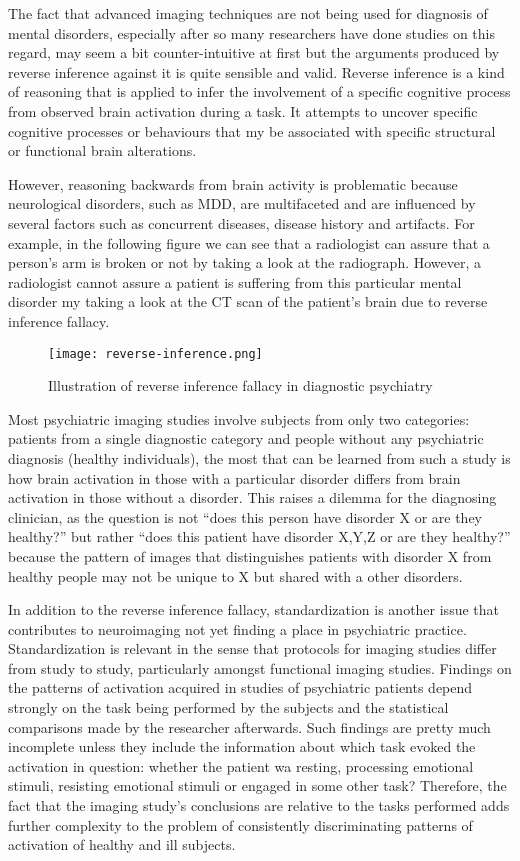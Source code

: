 \documentclass[12pt]{article}
\begin{document}
The fact that advanced imaging techniques are not being used for
diagnosis of mental disorders, especially after so many researchers
have done studies on this regard, may seem a bit counter-intuitive at
first but the arguments produced by reverse inference against it is
quite sensible and valid. Reverse inference is a kind of reasoning
that is applied to infer the involvement of a specific cognitive
process from observed brain activation during a task. It attempts to
uncover specific cognitive processes or behaviours that my be
associated with specific structural or functional brain alterations.

However, reasoning backwards from brain activity is problematic
because neurological disorders, such as MDD, are multifaceted and are
influenced by several factors such as concurrent diseases, disease
history and artifacts. For example, in the following figure we can see
that a radiologist can assure that a person’s arm is broken or not by
taking a look at the radiograph. However, a radiologist cannot assure
a patient is suffering from this particular mental disorder my taking
a look at the CT scan of the patient’s brain due to reverse inference
fallacy.

\begin{figure}[H]
  \centering
  \texttt{[image: reverse-inference.png]}
  \caption{Illustration of reverse inference fallacy in diagnostic
  psychiatry}
\end{figure}

Most psychiatric imaging studies involve subjects from only two
categories: patients from a single diagnostic category and people
without any psychiatric diagnosis (healthy individuals), the most that
can be learned from such a study is how brain activation in those with
a particular disorder differs from brain activation in those without
a disorder. This raises a dilemma for the diagnosing clinician, as the
question is not ``does this person have disorder X or are they
healthy?'' but rather ``does this patient have disorder X,Y,Z or are
they healthy?'' because the pattern of images that distinguishes
patients with disorder X from healthy people may not be unique to
X but shared with a other disorders.

In addition to the reverse inference fallacy, standardization is
another issue that contributes to neuroimaging not yet finding
a place in psychiatric practice. Standardization is relevant in the
sense that protocols for imaging studies differ from study to study,
particularly amongst functional imaging studies. Findings on the
patterns of activation acquired in studies of psychiatric patients
depend strongly on the task being performed by the subjects and the
statistical comparisons made by the researcher afterwards. Such
findings are pretty much incomplete unless they include the
information about which task evoked the activation in question:
whether the patient wa resting, processing emotional stimuli,
resisting emotional stimuli or engaged in some other task? Therefore,
the fact that the imaging study’s conclusions are relative to the
tasks performed adds further complexity to the problem of consistently
discriminating patterns of activation of healthy and ill subjects.
\end{document}
